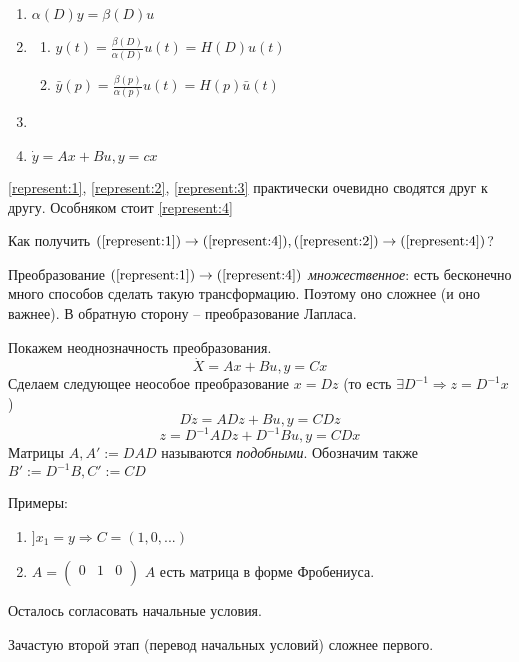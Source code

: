 \documentclass[main.tex]{subfiles}
\begin{document}
\begin{enumerate}[noitemsep]
	\item $ \alpha(D)y = \beta(D)u $ \label{represent:1}
	\item  \label{represent:2}
	\begin{enumerate}[noitemsep]
		\item $ y(t) = \frac{\beta(D)}{\alpha(D)}u(t) = H(D)u(t) $
		\item $ \bar y(p) = \frac{\beta(p)}{\alpha(p)}u(t) = H(p) \bar u(t) $
	\end{enumerate}
	\item \label{represent:3} %
	\item $ \dot y = Ax + Bu, y = cx $ \label{represent:4} %
\end{enumerate}

\ref{represent:1}, \ref{represent:2}, \ref{represent:3} практически очевидно сводятся друг к другу.
Особняком стоит \ref{represent:4}


Как получить $ (\ref{represent:1}) \to (\ref{represent:4}), (\ref{represent:2}) \to (\ref{represent:4}) $?

Преобразование $ (\ref{represent:1}) \to (\ref{represent:4}) $ \emph{множественное}: есть бесконечно много способов сделать такую трансформацию.
Поэтому оно сложнее (и оно важнее).
В обратную сторону -- преобразование Лапласа.

Покажем неоднозначность преобразования.
$$ \dot X = Ax + Bu, y = Cx $$
Сделаем следующее неособое преобразование $ x = Dz $ (то есть $ \exists D^{-1} \Rightarrow z = D^{-1}x $)
$$ D \dot z = ADz + Bu, y = CDz $$
$$ z = D^{-1}ADz + D^{-1}Bu, y = CDx $$
Матрицы $ A, A':=DAD $ называются \emph{подобными}. Обозначим также $B':=D^{-1}B, C':=CD$

Примеры:
\begin{enumerate}[noitemsep]
	\item $ ] x_1 = y \Rightarrow C = (1, 0, ...) $
	\item $ A = \begin{pmatrix}
	 0 & 1 & 0 \\ %
	\end{pmatrix} $
	$ A $ есть матрица в форме Фробениуса.
\end{enumerate}

Осталось согласовать начальные условия.

Зачастую второй этап (перевод начальных условий) сложнее первого.
\end{document}
